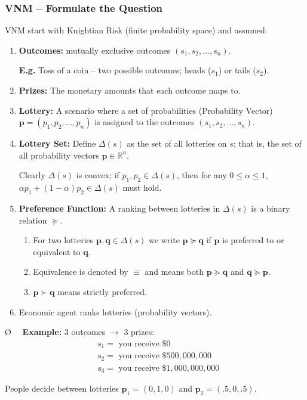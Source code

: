 \documentclass[13pt]{article}
\theoremstyle{definition}
\theoremstyle{remark}
\newenvironment{point}
  {\O~~}
  {}
\begin{document}
\subsubsection{VNM -- Formulate the Question}
VNM start with Knightian Risk (finite probability space) and assumed:
\begin{enumerate}[label=(\arabic*)]
    \item \textbf{Outcomes: } mutually exclusive outcomes $(s_1, s_2, \dots, s_n)$.

    \textbf{E.g. } Toss of a coin -- two possible outcomes; heads ($s_1$) or tails ($s_2$). 
    \item \textbf{Prizes: } The monetary amounts that each outcome maps to.
    \item \textbf{Lottery:} A scenario where a set of probabilities (Probability Vector) $\mathbf{p} = (p_1, p_2, \dots, p_n)$ is assigned to the outcomes $(s_1, s_2, \dots, s_n)$. 
    \item \textbf{Lottery Set:} Define $\Delta(s)$ as the set of all lotteries on $s$; that is, the set of all probability vectors $\mathbf{p} \in \mathbb{R}^n$.

    Clearly $\Delta(s)$ is convex; if $p_1, p_2\in\Delta(s)$, then for any $0\leq\alpha\leq1$, $\alpha p_1+(1-\alpha)p_2\in\Delta(s)$ must hold.
    \item \textbf{Preference Function:} A ranking between lotteries in $\Delta(s)$ is a binary relation $\succeq$. 
    \begin{enumerate}[label=(\alph*)]
        \item For two lotteries $\mathbf{p},\mathbf{q}\in\Delta(s)$ we write $\mathbf{p}\succeq \mathbf{q}$ if $\mathbf{p}$ is preferred to or equivalent to $\mathbf{q}$.
        \item Equivalence is denoted by $\equiv$ and means both $\mathbf{p}\succeq \mathbf{q}$ and $\mathbf{q}\succeq \mathbf{p}$.
        \item $\mathbf{p}\succ \mathbf{q}$ means strictly preferred.
    \end{enumerate}
    \item Economic agent ranks lotteries (probability vectors).
\end{enumerate}

\begin{point}
    \textbf{Example: } $3$ outcomes $\longrightarrow$  $3$ prizes:
    $$
    \begin{aligned}
    & \mathrm{s}_{1}=\text { you receive } \$ 0 \\
    & \mathrm{s}_{2}=\text { you receive } \$ 500,000,000 \\
    & \mathrm{s}_{3}=\text { you receive } \$ 1,000,000,000
    \end{aligned}
    $$

People decide between lotteries $\mathbf{p}_{1}=(0,1,0)$ and $\mathbf{p}_{2}=(.5,0, .5)$.
\end{point} 
\end{document}

